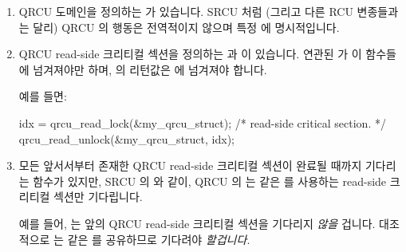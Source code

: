\begin{enumerate}
\item	QRCU 도메인을 정의하는  가 있습니다.
	SRCU 처럼 (그리고 다른 RCU 변종들과는 달리) QRCU 의 행동은 전역적이지
	않으며 특정  에 명시적입니다.
\item	QRCU read-side 크리티컬 섹션을 정의하는  과
	 이 있습니다.
	연관된  가 이 함수들에 넘겨져야만 하며,
	 의 리턴값은  에 넘겨져야
	합니다.

	예를 들면:

\iffalse

\item	There is a \co{qrcu_struct} that defines a QRCU domain.
	Like SRCU (and unlike other variants of RCU) QRCU's action
	is not global, but instead focused on the specified
	\co{qrcu_struct}.
\item	There are \co{qrcu_read_lock()} and \co{qrcu_read_unlock()}
	primitives that delimit QRCU read-side critical sections.
	The corresponding \co{qrcu_struct} must be passed into
	these primitives, and the return value from \co{qrcu_read_lock()}
	must be passed to \co{qrcu_read_unlock()}.

	For example:

\fi

\begin{VerbatimU}
idx = qrcu_read_lock(&my_qrcu_struct);
/* read-side critical section. */
qrcu_read_unlock(&my_qrcu_struct, idx);
\end{VerbatimU}

\item	모든 앞서서부터 존재한 QRCU read-side 크리티컬 섹션이 완료될 때까지
	기다리는  함수가 있지만, SRCU 의
	 와 같이, QRCU 의  는
	같은  를 사용하는 read-side 크리티컬 섹션만 기다립니다.

	예를 들어,  는 앞의 QRCU
	read-side 크리티컬 섹션을 기다리지 \emph{않을} 겁니다.
	대조적으로  는 같은
	 를 공유하므로 기다려야 \emph{할겁니다}.

\iffalse

\item	There is a \co{synchronize_qrcu()} primitive that blocks until
	all pre-existing QRCU read-side critical sections complete,
	but, like SRCU's \co{synchronize_srcu()}, QRCU's
	\co{synchronize_qrcu()} need wait only for those read-side
	critical sections that are using the same \co{qrcu_struct}.

	For example, \co{synchronize_qrcu(&your_qrcu_struct)}
	would \emph{not} need to wait on the earlier QRCU read-side
	critical section.
	In contrast, \co{synchronize_qrcu(&my_qrcu_struct)}
	\emph{would} need to wait, since it shares the same
	\co{qrcu_struct}.

\fi

\end{enumerate}

